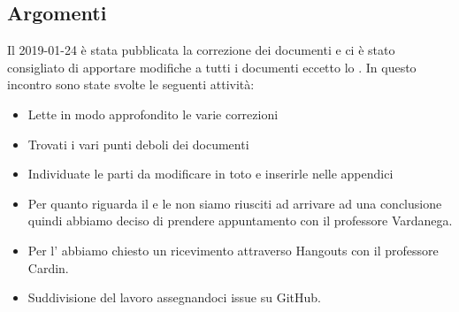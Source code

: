         \subsection{Argomenti}
            Il 2019-01-24 è stata pubblicata la correzione dei documenti e ci è stato consigliato di apportare modifiche a tutti i documenti eccetto lo \SdFd.
            In questo incontro sono state svolte le seguenti attività:
            \begin{itemize}
                \item Lette in modo approfondito le varie correzioni
                \item Trovati i vari punti deboli dei documenti
                \item Individuate le parti da modificare in toto e inserirle nelle appendici
                \item Per quanto riguarda il  e le  non siamo riusciti ad arrivare ad una conclusione quindi abbiamo deciso di prendere appuntamento con il professore Vardanega. 
                \item Per l' abbiamo chiesto un ricevimento attraverso Hangouts con il professore Cardin.
                \item Suddivisione del lavoro assegnandoci issue su GitHub.
        \end{itemize}

